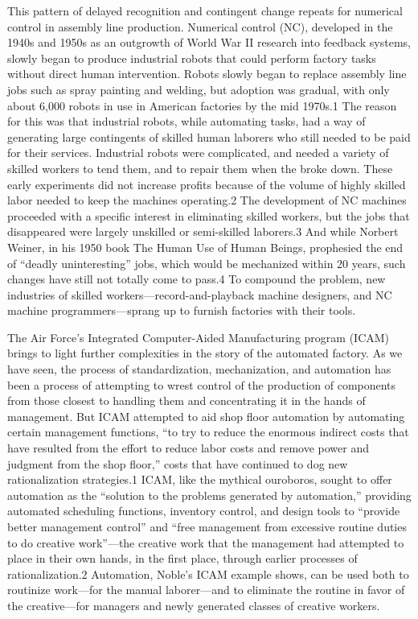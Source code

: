 This pattern of delayed recognition and contingent change repeats for
numerical control in assembly line production. Numerical control (NC),
developed in the 1940s and 1950s as an outgrowth of World War II
research into feedback systems, slowly began to produce industrial
robots that could perform factory tasks without direct human
intervention. Robots slowly began to replace assembly line jobs such
as spray painting and welding, but adoption was gradual, with only
about 6,000 robots in use in American factories by the mid 1970s.1 The
reason for this was that industrial robots, while automating tasks,
had a way of generating large contingents of skilled human laborers
who still needed to be paid for their services. Industrial robots were
complicated, and needed a variety of skilled workers to tend them, and
to repair them when the broke down. These early experiments did not
increase profits because of the volume of highly skilled labor needed
to keep the machines operating.2 The development of NC machines
proceeded with a specific interest in eliminating skilled workers, but
the jobs that disappeared were largely unskilled or semi-skilled
laborers.3 And while Norbert Weiner, in his 1950 book The Human Use of
Human Beings, prophesied the end of “deadly uninteresting” jobs, which
would be mechanized within 20 years, such changes have still not
totally come to pass.4 To compound the problem, new industries of
skilled workers—record-and-playback machine designers, and NC machine
programmers—sprang up to furnish factories with their tools.

The Air Force's Integrated Computer-Aided Manufacturing program (ICAM)
brings to light further complexities in the story of the automated
factory. As we have seen, the process of standardization,
mechanization, and automation has been a process of attempting to
wrest control of the production of components from those closest to
handling them and concentrating it in the hands of management. But
ICAM attempted to aid shop floor automation by automating certain
management functions, “to try to reduce the enormous indirect costs
that have resulted from the effort to reduce labor costs and remove
power and judgment from the shop floor,” costs that have continued to
dog new rationalization strategies.1 ICAM, like the mythical
ouroboros, sought to offer automation as the “solution to the problems
generated by automation,” providing automated scheduling functions,
inventory control, and design tools to “provide better management
control” and “free management from excessive routine duties to do
creative work”—the creative work that the management had attempted to
place in their own hands, in the first place, through earlier
processes of rationalization.2 Automation, Noble's ICAM example shows,
can be used both to routinize work—for the manual laborer—and to
eliminate the routine in favor of the creative—for managers and newly
generated classes of creative workers. 

